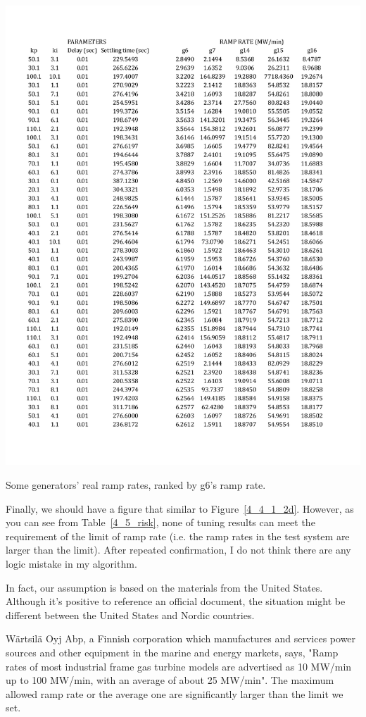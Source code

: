 \begin{table}[htbp]
\centering
\includegraphics[width = \textwidth]{figure/4_5_risk.pdf}
\caption{Some generators' real ramp rates, ranked by g6's ramp rate.}
\label{4_5_risk}
\end{table}


Finally, we should have a figure that similar to Figure~\ref{4_4_1_2d}. However, as you can see from Table~\ref{4_5_risk}, none of tuning results can meet the requirement of the limit of ramp rate (i.e. the ramp rates in the test system are larger than the limit). After repeated confirmation, I do not think there are any logic mistake in my algorithm. 

In fact, our assumption is based on the materials from the United States. Although it's positive to reference an official document, the situation might be different between the United States and Nordic countries.

Wärtsilä Oyj Abp, a Finnish corporation which manufactures and services power sources and other equipment in the marine and energy markets, says, \cite{Combustion} "Ramp rates of most industrial frame gas turbine models are advertised as 10 MW/min up to 100 MW/min, with an average of about 25 MW/min". The maximum allowed ramp rate or the average one are significantly larger than the limit we set.

